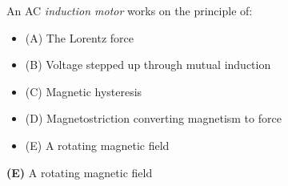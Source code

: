 

An AC {\it induction motor} works on the principle of:

\begin{itemize}
\item{(A)} The Lorentz force
\vskip 5pt 
\item{(B)} Voltage stepped up through mutual induction
\vskip 5pt 
\item{(C)} Magnetic hysteresis
\vskip 5pt 
\item{(D)} Magnetostriction converting magnetism to force
\vskip 5pt 
\item{(E)} A rotating magnetic field
\end{itemize}







{\bf (E)} A rotating magnetic field











